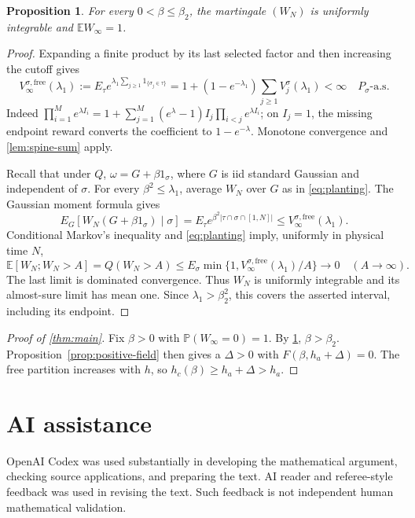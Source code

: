 \documentclass[11pt]{article}
\newtheorem{proposition}[proposition]{Proposition}
\theoremstyle{remark}
\numberwithin{equation}{section}
\newcommand{\E}{\mathbb E}
\newcommand{\Penv}{\mathbb P}
\begin{document}
\begin{proposition}\label{prop:UI}
For every $0<\beta\le\beta_2$, the martingale $(W_N)$ is uniformly
integrable and $\E W_\infty=1$.
\end{proposition}
\begin{proof}
Expanding a finite product by its last selected factor and then increasing
the cutoff gives
\begin{equation}\label{eq:free-spine}
 V_\infty^{\sigma,\mathrm{free}}(\lambda_1)
 :=E_\tau e^{\lambda_1\sum_{j\ge1}1_{\{\sigma_j\in\tau\}}}
 =1+(1-e^{-\lambda_1})\sum_{j\ge1}V_j^\sigma(\lambda_1)<\infty
 \quad P_\sigma\text{-a.s.}
\end{equation}
Indeed $\prod_{i=1}^M e^{\lambda I_i}
=1+\sum_{j=1}^M(e^\lambda-1)I_j\prod_{i<j}e^{\lambda I_i}$;
on $I_j=1$, the missing endpoint reward converts the coefficient to
$1-e^{-\lambda}$. Monotone convergence and \cref{lem:spine-sum} apply.

Recall that under $Q$, $\omega=G+\beta1_\sigma$, where $G$ is iid standard
Gaussian and independent of $\sigma$. For every $\beta^2\le\lambda_1$, average
$W_N$ over $G$ as in \eqref{eq:planting}. The Gaussian moment formula gives
\[
 E_G[W_N(G+\beta1_\sigma)\mid\sigma]
   =E_\tau e^{\beta^2|\tau\cap\sigma\cap[1,N]|}
   \le V_\infty^{\sigma,\mathrm{free}}(\lambda_1).
\]
Conditional Markov's inequality and \eqref{eq:planting} imply, uniformly
in physical time $N$,
\[
 \E[W_N;W_N>A]=Q(W_N>A)
 \le E_\sigma\min\{1,V_\infty^{\sigma,\mathrm{free}}(\lambda_1)/A\}
 \longrightarrow0\quad(A\to\infty).
\]
The last limit is dominated convergence. Thus $W_N$ is uniformly
integrable and its almost-sure limit has mean one. Since
$\lambda_1>\beta_2^2$, this covers the asserted interval, including its
endpoint.
\end{proof}

\begin{proof}[Proof of \cref{thm:main}]
Fix $\beta>0$ with $\Penv(W_\infty=0)=1$. By \cref{prop:UI},
$\beta>\beta_2$. Proposition~\ref{prop:positive-field} then gives a
$\Delta>0$ with $F(\beta,h_a+\Delta)=0$. The free partition increases
with $h$, so $h_c(\beta)\ge h_a+\Delta>h_a$.
\end{proof}

\section*{AI assistance}
OpenAI Codex was used substantially in developing the mathematical argument,
checking source applications, and preparing the text. AI reader and
referee-style feedback was used in revising the text. Such feedback is not
independent human mathematical validation.
\end{document}
